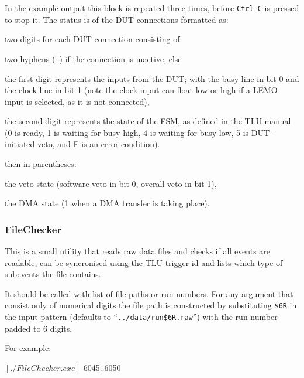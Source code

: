 In the example output this block is repeated three times, before \texttt{Ctrl-C} is pressed to stop it.
The status is of the \gls{DUT} connections formatted as:
\begin{myitemize}
\item two digits for each \gls{DUT} connection consisting of:
  \begin{myitemize}
  \item two hyphens (\texttt{--}) if the connection is inactive, else
  \item the first digit represents the inputs from the \gls{DUT}; with the busy line in bit 0 and the clock line in bit 1
  (note the clock input can float low or high if a LEMO input is selected, as it is not connected),
  \item the second digit represents the state of the FSM, as defined in the \gls{TLU} manual\cite{Cussans2009}
  (0 is ready, 1 is waiting for busy high, 4 is waiting for busy low, 5 is \gls{DUT}-initiated veto, and F is an error condition).
  \end{myitemize}
\item then in parentheses:
  \begin{myitemize}
  \item the veto state (software veto in bit 0, overall veto in bit 1),
  \item the DMA state (1 when a DMA transfer is taking place).
  \end{myitemize}
\end{myitemize}


\subsubsection{FileChecker}
\label{sec:FileChecker}

This is a small utility that reads raw data files and checks if all events are
readable, can be syncronised using the TLU trigger id and lists which type
of subevents the file contains.

It should be called with list of file paths or run numbers. For any argument
that consist only of numerical digits the file path is constructed by
substituting \texttt{\$6R} in the input pattern (defaults to
``\texttt{../data/run\$6R.raw}'') with the run number padded to 6 digits.

For example:
\begin{listing}[mybash]
$[./FileChecker.exe]$ {6045..6050}
\end{listing}

